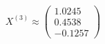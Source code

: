 \documentclass[preview]{standalone}
\begin{document}
\begin{align*}
X^{(3)} \approx \begin{pmatrix} 1.0245 \\ 0.4538 \\ -0.1257 \end{pmatrix}
\end{align*}
\end{document}
